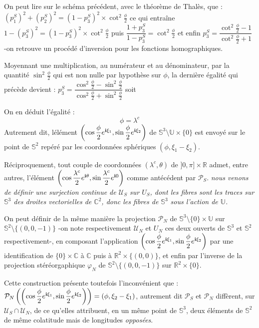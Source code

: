 \par
On peut lire sur le sch\'ema pr\'ec\'edent, avec le th\'eor\`eme de Thal\`es, que : %
$(p_1^S)^2+(p_2^S)^2=(1-p_3^S)^2\times\cot^2\frac{\phi}{2}$ ce qui entra\^ine $1-(p_3^S)^2=(1-p_3^S)^2\times\cot^2 \frac{\phi}{2}$
puis $\dfrac{1+p_3^S}{1-p_3^S}=\cot^2\frac{\phi}{2}$ et enfin $p_3^S=\dfrac{\cot^2 \frac{\phi}{2}-1}{\cot^2 \frac{\phi}{2}+1}$ %
-on retrouve un proc\'ed\'e d'inversion pour les fonctions homographiques.

\par
Moyennant une multiplication, au num\'erateur et au d\'enominateur, par la quantit\'e $\sin^2\frac{\phi}{2}$ qui est non nulle par hypoth\`ese sur $\phi$, %
la derni\`ere \'egalit\'e qui pr\'ec\`ede devient : %
$p_3^S=\dfrac{\cos^2 \frac{\phi}{2}-\sin^2\frac{\phi}{2}}{\cos^2\frac{\phi}{2}+\sin^2 \frac{\phi}{2}}$ soit 

\par
On en d\'eduit l'\'egalit\'e : \[\phi=\lambda^c\]
Autrement dit, l\'el\'ement $\left(\cos\dfrac{\phi}{2}e^{\mathbf{i}\xi_1},\sin\dfrac{\phi}{2}e^{\mathbf{i}\xi_2}\right)$ de $\mathbb{S}^3\setminus\mathbb{U}\times\{0\}$ est envoy\'e sur %
le point de $\mathbb{S}^2$ rep\'er\'e par les coordonn\'ees sph\'eriques $(\phi,\xi_1-\xi_2)$.

\par
R\'eciproquement, tout couple de coordonn\'ees $(\lambda^c,\theta)$ de $]0,\pi]\times\mathbb{R}$ admet, entre autres, l'\'el\'ement $\left(\cos\dfrac{\lambda^c}{2}e^{\mathbf{i}\theta},\sin\dfrac{\lambda^c}{2}e^{\mathbf{i}0}\right)$ %
comme ant\'ec\'edent par $\mathcal{P}_S$. \emph{nous venons de d\'efinir une surjection continue de $\mathcal{U}_S$ sur $U_S$, %
dont les fibres sont les traces sur $\mathbb{S}^3$ des droites vectorielles de $\mathbb{C}^2$, donc les fibres de $\mathbb{S}^3$ sous l'action de $\mathbb{U}$.}

\par
On peut d\'efinir de la m\^eme mani\`ere la projection $\mathcal{P}_N$ de $\mathbb{S}^3\setminus\{0\}\times\mathbb{U}$ sur $\mathbb{S}^2\setminus\{(0,0,-1)\}$ %
-on note respectivement $\mathcal{U}_N$ et $U_N$ ces deux ouverts de $\mathbb{S}^3$ et $\mathbb{S}^2$ respectivement-, %
en composant l'application $\left(\cos\dfrac{\phi}{2}e^{\mathbf{i}\xi_1},\sin\dfrac{\phi}{2}e^{\mathbf{i}\xi_2}\right)$ par une identification de $\{0\}\times\mathbb{C}$ \`a $\mathbb{C}$ puis \`a $\mathbb{R}^2\times\{(0,0)\}$, %
et enfin par l'inverse de la projection st\'er\'eorgaphique $\varphi_N$ de $\mathbb{S}^2\setminus\{(0,0,-1)\}$ sur $\mathbb{R}^2\times\{0\}$.

\par
Cette construction pr\'esente toutefois l'inconv\'enient que : $\mathcal{P}_N\left(\left(\cos\dfrac{\phi}{2}e^{\mathbf{i}\xi_1},\sin\dfrac{\phi}{2}e^{\mathbf{i}\xi_2}\right)\right)=(\phi ,\xi_2-\xi_1)$, %
autrement dit $\mathcal{P}_S$ et $\mathcal{P}_N$ diff\`erent, sur $\mathcal{U}_S\cap\mathcal{U}_N$, de ce qu'elles attribuent, en un m\^eme point de $\mathbb{S}^3$, %
deux \'el\'ements de $\mathbb{S}^2$ de m\^eme colatitude mais de longitudes \emph{oppos\'ees}.

